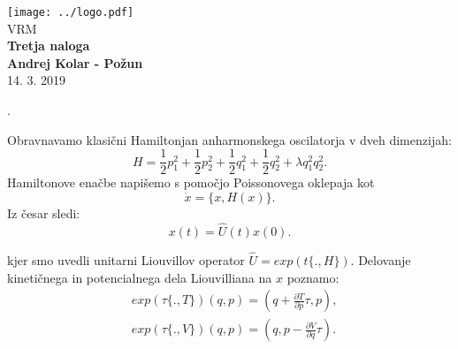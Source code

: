\documentclass{article}
\begin{document}
\begin{titlepage}
    \begin{center}
        \vspace*{1cm}
        \Large
\texttt{[image: ../logo.pdf]}\\
        \Large
\vspace{1cm}
        VRM\\
        \huge
        \textbf{Tretja naloga\\}
\Large  
        \vspace{1cm}
        \textbf{Andrej Kolar - Po{\v z}un\\}
        \vspace{0.8cm}
 14. 3. 2019

\vfill
\normalsize
\end{center}. 
\end{titlepage}
\newpage
{}

Obravnavamo klasični Hamiltonjan anharmonskega oscilatorja v dveh dimenzijah:
\begin{equation*}
H = \frac{1}{2} p_1^2 + \frac{1}{2} p_2^2 +\frac{1}{2} q_1^2 +\frac{1}{2} q_2^2 + \lambda q_1^2 q_2^2.
\end{equation*}
Hamiltonove enačbe napišemo s pomočjo Poissonovega oklepaja kot
\begin{equation*}
\dot{x} = \{ x, H(x) \}.
\end{equation*}
Iz česar sledi:
\begin{equation*}
x(t) = \widehat{U}(t) x(0).
\end{equation*}

kjer smo uvedli unitarni Liouvillov operator $\widehat{U} = exp(t \{.,H \})$.
Delovanje kinetičnega in potencialnega dela Liouvilliana na $x$ poznamo:
\begin{align*}
&exp(\tau \{ . , T \}) (q, p) = \left( q+ \frac{\partial T}{\partial p} \tau, p \right), \\
&exp(\tau \{ . , V \}) (q, p) = \left( q, p -  \frac{\partial V}{\partial q} \tau \right).
\end{align*}
\end{document}

